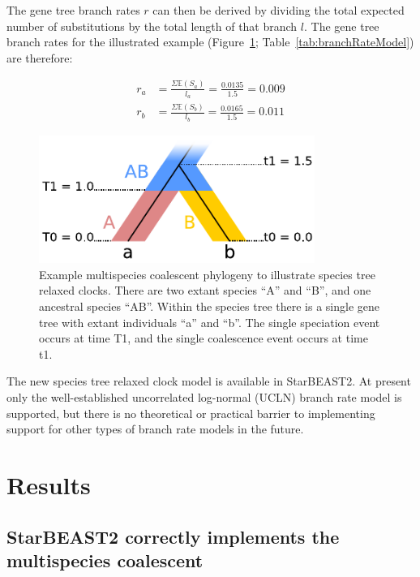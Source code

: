 \documentclass[12pt]{article}
\begin{document}
The gene tree branch rates $r$ can then be derived by dividing the total
expected number of substitutions by the total length of that branch $l$. The
gene tree branch rates for the illustrated example
(Figure~\ref{fig:branchRateModel}; Table~\ref{tab:branchRateModel}) are
therefore:

\begin{align}
r_a &= \frac{\Sigma \mathbb{E}(S_a)}{l_a} = \frac{0.0135}{1.5} = 0.009\\
r_b &= \frac{\Sigma \mathbb{E}(S_b)}{l_b} = \frac{0.0165}{1.5} = 0.011
\end{align}

\begin{figure}[htb!]
\centering
\includegraphics[width=9cm]{relaxed_clock.pdf}
\caption
{Example multispecies coalescent phylogeny to illustrate species tree relaxed
clocks. There are two extant species ``A'' and ``B'', and one ancestral species ``AB''.
Within the species tree there is a single gene tree with extant individuals ``a''
and ``b''. The single speciation event occurs at time T1, and the single coalescence
event occurs at time t1.}
\label{fig:branchRateModel}
\end{figure}

The new species tree relaxed clock model is available in StarBEAST2. At present
only the well-established uncorrelated log-normal (UCLN) branch rate model
\citep{10.1371/journal.pbio.0040088} is supported, but there is no theoretical
or practical barrier to implementing support for other types of branch rate
models in the future.

\section*{Results}

\subsection*{StarBEAST2 correctly implements the multispecies coalescent}
\end{document}

